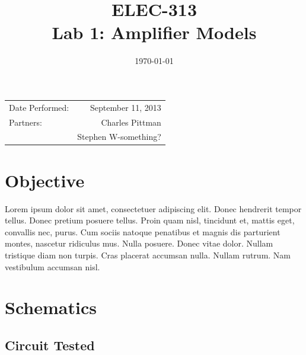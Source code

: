 \documentclass{article}
\author{}
\title{ELEC-313 \\ Lab 1: Amplifier Models \\ }
\date{\today}
\begin{document}
\maketitle %

 \begin{center}
   \begin{tabular}{lr}
    Date Performed: & September 11, 2013 \\
    Partners: & Charles Pittman \\
              & Stephen W-something? \\
  \end{tabular}
\end{center}

\pagebreak


\renewcommand{\labelenumi}{\alph{enumi}.}

\section{Objective}

\label{sec:objective}

Lorem ipsum dolor sit amet, consectetuer adipiscing elit. Donec
hendrerit tempor tellus. Donec pretium posuere tellus. Proin quam
nisl, tincidunt et, mattis eget, convallis nec, purus. Cum sociis
natoque penatibus et magnis dis parturient montes, nascetur ridiculus
mus. Nulla posuere. Donec vitae dolor. Nullam tristique diam non
turpis. Cras placerat accumsan nulla. Nullam rutrum. Nam vestibulum
accumsan nisl.

\section{Schematics}
\label{sec:schematics}

\subsection*{Circuit Tested}
\label{sec:ckt_tested}
\end{document}
